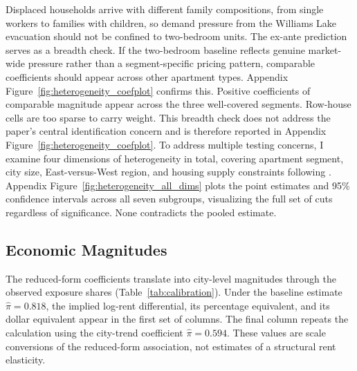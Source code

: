 \documentclass[12pt]{article}
\begin{document}
Displaced households arrive with different family compositions, from
single workers to families with children, so demand pressure from the
Williams Lake evacuation should not be confined to two-bedroom units.
The ex-ante prediction serves as a breadth check. If the two-bedroom baseline
reflects genuine market-wide pressure rather than a segment-specific
pricing pattern, comparable coefficients should appear across other
apartment types. Appendix Figure~\ref{fig:heterogeneity_coefplot}
confirms this. Positive coefficients of comparable magnitude appear
across the three well-covered segments. Row-house cells are too sparse
to carry weight. This breadth check does not address the paper's central
identification concern and is therefore reported in Appendix Figure~\ref{fig:heterogeneity_coefplot}.
To address multiple testing concerns, I examine four dimensions of heterogeneity in total, covering apartment
segment, city size, East-versus-West region, and housing supply
constraints following \citet{saiz2010}. Appendix Figure~\ref{fig:heterogeneity_all_dims}
plots the point estimates and 95\% confidence intervals across all
seven subgroups, visualizing the full set of cuts regardless of
significance. None contradicts the pooled estimate.

\subsection{Economic Magnitudes}
\label{sec:economic_calibration}

The reduced-form coefficients translate into city-level magnitudes through the
observed exposure shares (Table~\ref{tab:calibration}). Under the baseline
estimate $\hat{\pi}=0.818$, the implied log-rent differential, its percentage
equivalent, and its dollar equivalent appear in the first set of columns.
The final column repeats the calculation using the city-trend coefficient
$\hat{\pi}=0.594$. These values are scale conversions of the reduced-form
association, not estimates of a structural rent elasticity.
\end{document}
